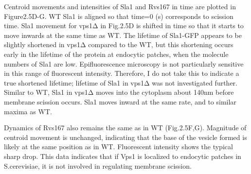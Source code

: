 \vspace{5mm}
Centroid movements and intensities of Sla1 and Rvs167 in time are plotted in Figure2.5D-G. WT Sla1 is aligned so that time=0 (s) corresponds to scission time. Sla1 movement for vps1Δ in Fig.2.5D is shifted in time so that it starts to move inwards at the same time as WT. The lifetime of Sla1-GFP appears to be slightly shortened in vps1Δ compared to the WT, but this shortening occurs early in the lifetime of the protein at endocytic patches, when the molecule numbers of Sla1 are low. Epifluorescence microscopy is not particularly sensitive in this range of fluorescent intensity. Therefore, I do not take this to indicate a true shortened lifetime; lifetime of Sla1 in vps1Δ was not investigated further. Similar to WT, Sla1 in vps1Δ moves into the cytoplasm about 140nm before membrane scission occurs. Sla1 moves inward at the same rate, and to similar maxima as WT. 

\vspace{5mm}
Dynamics of Rvs167 also remains the same as in WT (Fig.2.5F,G). Magnitude of centroid movement is unchanged, indicating that the base of the vesicle formed is likely at the same position as in WT. Fluorescent intensity shows the typical sharp drop. This data indicates that if Vps1 is localized to endocytic patches in S.cerevisiae, it is not involved in regulating membrane scission.  
\vspace{5mm}

